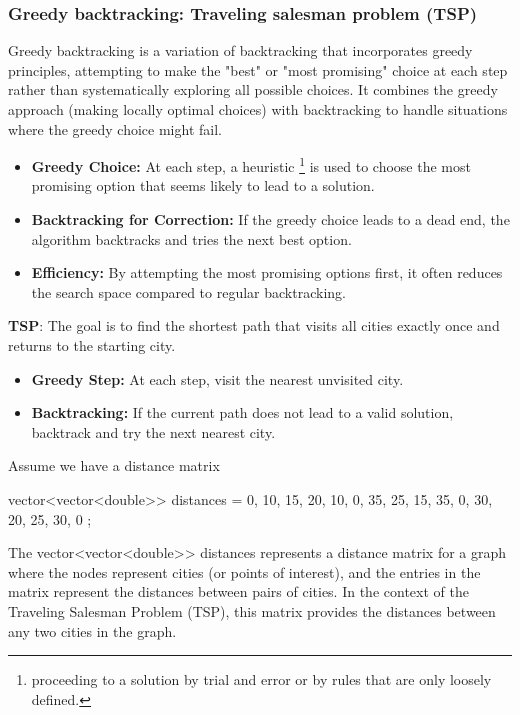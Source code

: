 \documentclass{report}
\begin{document}
\bigbreak \noindent 
\subsubsection{Greedy backtracking: Traveling salesman problem (TSP)}
\bigbreak \noindent 
Greedy backtracking is a variation of backtracking that incorporates greedy principles, attempting to make the "best" or "most promising" choice at each step rather than systematically exploring all possible choices. It combines the greedy approach (making locally optimal choices) with backtracking to handle situations where the greedy choice might fail.
\begin{itemize}
    \item \textbf{Greedy Choice:} At each step, a heuristic \footnote{proceeding to a solution by trial and error or by rules that are only loosely defined.} is used to choose the most promising option that seems likely to lead to a solution.
    \item \textbf{Backtracking for Correction:} If the greedy choice leads to a dead end, the algorithm backtracks and tries the next best option.
    \item \textbf{Efficiency:} By attempting the most promising options first, it often reduces the search space compared to regular backtracking.
\end{itemize}
\bigbreak \noindent 
\textbf{TSP}: The goal is to find the shortest path that visits all cities exactly once and returns to the starting city.
\begin{itemize}
    \item \textbf{Greedy Step:} At each step, visit the nearest unvisited city.
    \item \textbf{Backtracking:} If the current path does not lead to a valid solution, backtrack and try the next nearest city.
\end{itemize}
\bigbreak \noindent 
Assume we have a distance matrix
\bigbreak \noindent 
\begin{cppcode}
    vector<vector<double>> distances = {
        {0, 10, 15, 20},
        {10, 0, 35, 25},
        {15, 35, 0, 30},
        {20, 25, 30, 0}
    };
\end{cppcode}
\bigbreak \noindent 
The vector<vector<double>> distances represents a distance matrix for a graph where the nodes represent cities (or points of interest), and the entries in the matrix represent the distances between pairs of cities.
\bigbreak \noindent 
In the context of the Traveling Salesman Problem (TSP), this matrix provides the distances between any two cities in the graph.
\end{document}
